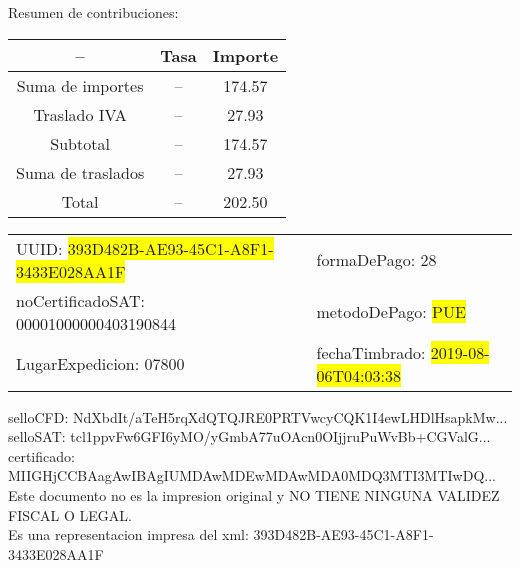 \documentclass{article}
\begin{document}
\begin{center}
Resumen de contribuciones:\\
\bigskip
\begin{tabular}{|c|c|c|}
\hline
 -- & Tasa & Importe\\
\hline

Suma de importes & -- & 174.57 \\
\hline

Traslado IVA & -- & 27.93 \\
\hline

Subtotal  & -- & 174.57 \\
\hline

Suma de traslados & -- & 27.93 \\
\hline

Total  & -- & 202.50 \\
\hline

\end{tabular}
\end{center}

\begin{tabular}{p{11cm}p{1cm}p{8cm}}
\bigskip
UUID: \colorbox{yellow}{ 393D482B-AE93-45C1-A8F1-3433E028AA1F } & & formaDePago: 28\\

noCertificadoSAT: 00001000000403190844 & & metodoDePago: \colorbox{yellow}{ PUE }\\

LugarExpedicion: 07800 & & fechaTimbrado: \colorbox{yellow}{ 2019-08-06T04:03:38 } \\
\end{tabular}

\bigskip
selloCFD: NdXbdIt/aTeH5rqXdQTQJRE0PRTVwcyCQK1I4ewLHDlHsapkMw... \\
selloSAT: tcl1ppvFw6GFI6yMO/yGmbA77uOAcn0OIjjruPuWvBb+CGValG... \\

certificado: MIIGHjCCBAagAwIBAgIUMDAwMDEwMDAwMDA0MDQ3MTI3MTIwDQ...\bigskip\bigskip\bigskip\bigskip\bigskip\bigskip
\\Este documento no es la impresion original y NO TIENE NINGUNA VALIDEZ FISCAL O LEGAL. \\
 Es una representacion impresa del xml:  393D482B-AE93-45C1-A8F1-3433E028AA1F \\
\end{document}
